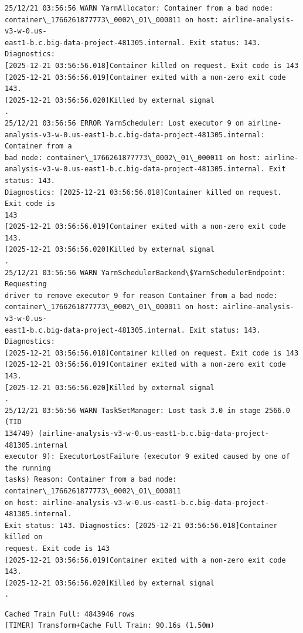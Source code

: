 \documentclass[11pt]{article}
\begin{document}
    \begin{Verbatim}[commandchars=\\\{\}]
25/12/21 03:56:56 WARN YarnAllocator: Container from a bad node:
container\_1766261877773\_0002\_01\_000011 on host: airline-analysis-v3-w-0.us-
east1-b.c.big-data-project-481305.internal. Exit status: 143. Diagnostics:
[2025-12-21 03:56:56.018]Container killed on request. Exit code is 143
[2025-12-21 03:56:56.019]Container exited with a non-zero exit code 143.
[2025-12-21 03:56:56.020]Killed by external signal
.
25/12/21 03:56:56 ERROR YarnScheduler: Lost executor 9 on airline-
analysis-v3-w-0.us-east1-b.c.big-data-project-481305.internal: Container from a
bad node: container\_1766261877773\_0002\_01\_000011 on host: airline-
analysis-v3-w-0.us-east1-b.c.big-data-project-481305.internal. Exit status: 143.
Diagnostics: [2025-12-21 03:56:56.018]Container killed on request. Exit code is
143
[2025-12-21 03:56:56.019]Container exited with a non-zero exit code 143.
[2025-12-21 03:56:56.020]Killed by external signal
.
25/12/21 03:56:56 WARN YarnSchedulerBackend\$YarnSchedulerEndpoint: Requesting
driver to remove executor 9 for reason Container from a bad node:
container\_1766261877773\_0002\_01\_000011 on host: airline-analysis-v3-w-0.us-
east1-b.c.big-data-project-481305.internal. Exit status: 143. Diagnostics:
[2025-12-21 03:56:56.018]Container killed on request. Exit code is 143
[2025-12-21 03:56:56.019]Container exited with a non-zero exit code 143.
[2025-12-21 03:56:56.020]Killed by external signal
.
25/12/21 03:56:56 WARN TaskSetManager: Lost task 3.0 in stage 2566.0 (TID
134749) (airline-analysis-v3-w-0.us-east1-b.c.big-data-project-481305.internal
executor 9): ExecutorLostFailure (executor 9 exited caused by one of the running
tasks) Reason: Container from a bad node: container\_1766261877773\_0002\_01\_000011
on host: airline-analysis-v3-w-0.us-east1-b.c.big-data-project-481305.internal.
Exit status: 143. Diagnostics: [2025-12-21 03:56:56.018]Container killed on
request. Exit code is 143
[2025-12-21 03:56:56.019]Container exited with a non-zero exit code 143.
[2025-12-21 03:56:56.020]Killed by external signal
.
    \end{Verbatim}

    \begin{Verbatim}[commandchars=\\\{\}]
Cached Train Full: 4843946 rows
[TIMER] Transform+Cache Full Train: 90.16s (1.50m)
    \end{Verbatim}

    \begin{Verbatim}[commandchars=\\\{\}]

    \end{Verbatim}
\end{document}
